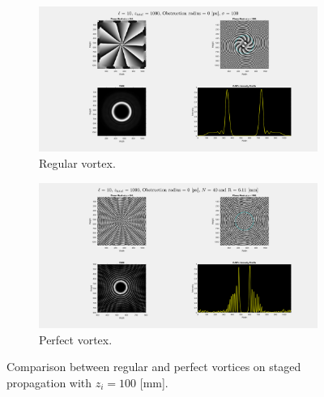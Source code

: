 \begin{figure}[htbp]
    \centering
    \begin{subfigure}[b]{0.45\textwidth}
        \centering
        \includegraphics[width=\textwidth]{images/Appendices/Additional_Results/Staged_Propagation/type=0_r=0_zi=100_zf=1000.png}
        \caption{Regular vortex.}
    \end{subfigure}
    \hfill
    \begin{subfigure}[b]{0.45\textwidth}
        \centering
        \includegraphics[width=\textwidth]{images/Appendices/Additional_Results/Staged_Propagation/type=1_r=0_zi=100_zf=1000.png}
        \caption{Perfect vortex.}
    \end{subfigure}
    \caption{Comparison between regular and perfect vortices on staged propagation with $z_i=100$ [mm].}
    \label{fig:staged_zi=100}
\end{figure}


